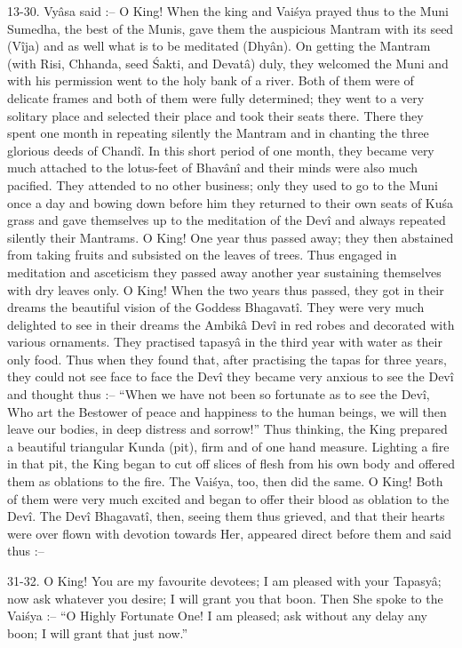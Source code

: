 13-30. Vy\^asa said :-- O King! When the king and Vai\'sya prayed thus to the Muni Sumedha, the best of the Munis, gave them the auspicious Mantram with its seed (V\^ija) and as well what is to be meditated (Dhy\^an). On getting the Mantram (with Risi, Chhanda, seed \'Sakti, and Devat\^a) duly, they welcomed the Muni and with his permission went to the holy bank of a river. Both of them were of delicate frames and both of them were fully determined; they went to a very solitary place and selected their place and took their seats there. There they spent one month in repeating silently the Mantram and in chanting the three glorious deeds of Chand\^i. In this short period of one month, they became very much attached to the lotus-feet of Bhav\^an\^i and their minds were also much pacified. They attended to no other business; only they used to go to the Muni once a day and bowing down before him they returned to their own seats of Ku\'sa grass and gave themselves up to the meditation of the Dev\^i and always repeated silently their Mantrams. O King! One year thus passed away; they then abstained from taking fruits and subsisted on the leaves of trees. Thus engaged in meditation and asceticism they passed away another year sustaining themselves with dry leaves only. O King! When the two years thus passed, they got in their dreams the beautiful vision of the Goddess Bhagavat\^i. They were very much delighted to see in their dreams the Ambik\^a Dev\^i in red robes and decorated with various ornaments. They practised tapasy\^a in the third year with water as their only food. Thus when they found that, after practising the tapas for three years, they could not see face to face the Dev\^i they became very anxious to see the Dev\^i and thought thus :-- ``When we have not been so fortunate as to see the Dev\^i, Who art the Bestower of peace and happiness to the human beings, we will then leave our bodies, in deep distress and sorrow!'' Thus thinking, the King prepared a beautiful triangular Kunda (pit), firm and of one hand measure. Lighting a fire in that pit, the King began to cut off slices of flesh from his own body and offered them as oblations to the fire. The Vai\'sya, too, then did the same. O King! Both of them were very much excited and began to offer their blood as oblation to the Dev\^i. The Dev\^i Bhagavat\^i, then, seeing them thus grieved, and that their hearts were over flown with devotion towards Her, appeared direct before them and said thus :--

31-32. O King! You are my favourite devotees; I am pleased with your Tapasy\^a; now ask whatever you desire; I will grant you that boon. Then She spoke to the Vai\'sya :-- ``O Highly Fortunate One! I am pleased; ask without any delay any boon; I will grant that just now.''

